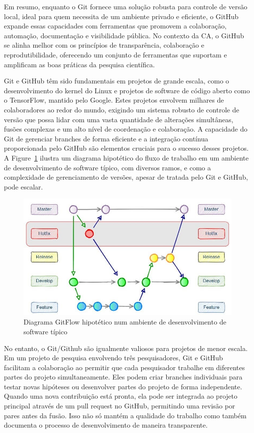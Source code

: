 \documentclass[
  a4paper,
]{article}
\begin{document}
Em resumo, enquanto o Git fornece uma solução robusta para controle de
versão local, ideal para quem necessita de um ambiente privado e
eficiente, o GitHub expande essas capacidades com ferramentas que
promovem a colaboração, automação, documentação e visibilidade pública.
No contexto da CA, o GitHub se alinha melhor com os princípios de
transparência, colaboração e reprodutibilidade, oferecendo um conjunto
de ferramentas que suportam e amplificam as boas práticas da pesquisa
científica.

Git e GitHub têm sido fundamentais em projetos de grande escala, como o
desenvolvimento do kernel do Linux e projetos de software de código
aberto como o TensorFlow, mantido pelo Google. Estes projetos envolvem
milhares de colaboradores ao redor do mundo, exigindo um sistema robusto
de controle de versão que possa lidar com uma vasta quantidade de
alterações simultâneas, fusões complexas e um alto nível de coordenação
e colaboração. A capacidade do Git de gerenciar branches de forma
eficiente e a integração contínua proporcionada pelo GitHub são
elementos cruciais para o sucesso desses projetos. A
Figure~\ref{fig-gitflow} ilustra um diagrama hipotético do fluxo de
trabalho em um ambiente de desenvolvimento de software típico, com
diversos ramos, e como a complexidade de gerenciamento de versões,
apesar de tratada pelo Git e GitHub, pode escalar.

\begin{figure}

\includegraphics{img/gitflow.jpg}

\caption{\label{fig-gitflow}Diagrama GitFlow hipotético num ambiente de
desenvolvimento de software típico}

\end{figure}%

No entanto, o Git/Github são igualmente valiosos para projetos de menor
escala. Em um projeto de pesquisa envolvendo três pesquisadores, Git e
GitHub facilitam a colaboração ao permitir que cada pesquisador trabalhe
em diferentes partes do projeto simultaneamente. Eles podem criar
branches individuais para testar novas hipóteses ou desenvolver partes
do projeto de forma independente. Quando uma nova contribuição está
pronta, ela pode ser integrada ao projeto principal através de um pull
request no GitHub, permitindo uma revisão por pares antes da fusão. Isso
não só mantém a qualidade do trabalho como também documenta o processo
de desenvolvimento de maneira transparente.
\end{document}
